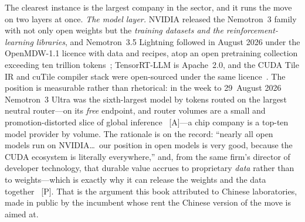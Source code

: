 The clearest instance is the largest company in the sector, and it runs the move on two layers at once. \emph{The model layer.} NVIDIA released the Nemotron~3 family with not only open weights but the \emph{training datasets and the reinforcement-learning libraries}, and Nemotron~3.5 Lightning followed in August 2026 under the OpenMDW-1.1 licence with data and recipes, atop an open pretraining collection exceeding ten trillion tokens~\cite{nemotron}; TensorRT-LLM is Apache~2.0, and the CUDA Tile IR and cuTile compiler stack were open-sourced under the same licence~\cite{cuda-tile}. The position is measurable rather than rhetorical: in the week to 29~August 2026 Nemotron~3 Ultra was the sixth-largest model by tokens routed on the largest neutral router---on its \emph{free} endpoint, and router volumes are a small and promotion-distorted slice of global inference~\cite{openrouter-aug26} [A]---a chip company is a top-ten model provider by volume. The rationale is on the record: ``nearly all open models run on NVIDIA\ldots\ our position in open models is very good, because the CUDA ecosystem is literally everywhere,'' and, from the same firm's director of developer technology, that durable value accrues to proprietary \emph{data} rather than to weights---which is exactly why it can release the weights and the data together~\cite{nvda-open-models} [P]. That is the argument this book attributed to Chinese laboratories, made in public by the incumbent whose rent the Chinese version of the move is aimed at.

